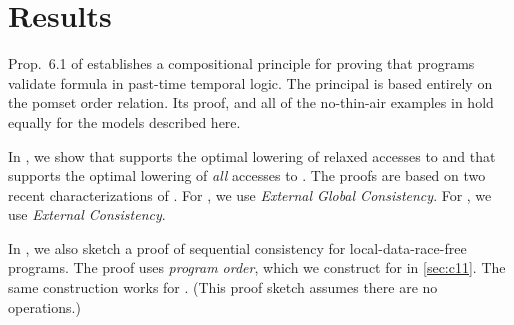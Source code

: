\section{\PwTmcaTITLE{} Results}
\label{sec:results}

Prop.~6.1 of \citet{DBLP:journals/pacmpl/JagadeesanJR20} establishes a
compositional principle for proving that programs validate formula in
past-time temporal logic.  The principal is based entirely on the pomset
order relation.  Its proof, and all of the no-thin-air examples in
\cite[]{DBLP:journals/pacmpl/JagadeesanJR20} hold equally for
the models described here.


In , we show that  supports the optimal
lowering of relaxed accesses to \armeight{} and that  supports the
optimal lowering of \emph{all} accesses to \armeight{}.  The proofs are based
on two recent characterizations of \armeight{} \cite{armed}.  For ,
we use \emph{External Global Consistency}.  For , we use
\emph{External Consistency}.

In , we also sketch a proof of sequential consistency for
local-data-race-free programs.  The proof uses \emph{program order}, which we
construct for \cXI{} in \textsection\ref{sec:c11}.  The same construction
works for \PwTmca{}.  (This proof sketch assumes there are no \RMW{} operations.)

